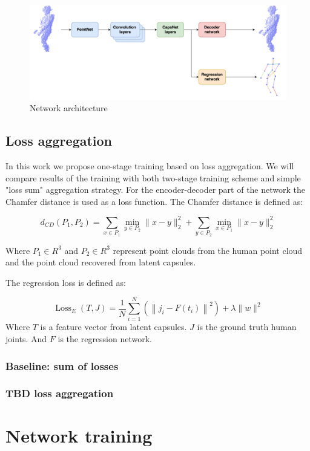 \begin{figure}[htbp]
    \centerline{\includegraphics[scale=.125]{Figures/network architecture.png}}
    \caption{Network architecture}
    \label{img:network-architecture}
\end{figure}


\subsection{Loss aggregation}
In this work we propose one-stage training based on loss aggregation. 
We will compare results of the training with both two-stage training scheme and simple "loss sum" aggregation strategy.
For the encoder-decoder part of the network the Chamfer distance is used as a loss function. 
The Chamfer distance is defined as:

\begin{equation}
d_{C D}\left(P_{1}, P_{2}\right)=\sum_{x \in P_{1}} \min _{y \in P_{2}}\|x-y\|_{2}^{2}+\sum_{y \in P_{2}} \min _{x \in P_{1}}\|x-y\|_{2}^{2}
\label{eqn:chamfer-distance}
\end{equation}

Where $P_1 \in R^3$ and $P_2 \in R^3$ represent point clouds from the human point cloud and the point cloud recovered from latent capsules.


The regression loss is defined as:

\begin{equation}
    \operatorname{Loss}_{E}(T, J)=\frac{1}{N} \sum_{i=1}^{N}\left(\left\|j_{i}-F\left(t_{i}\right)\right\|^{2}\right)+\lambda\|w\|^{2}
\label{eqn:regression-loss}
\end{equation}
Where $T$ is a feature vector from latent capsules. $J$ is the ground truth human joints. And $F$ is the regression network.

\subsubsection{Baseline: sum of losses}

\subsubsection{TBD loss aggregation}




\section{Network training}
\label{network-training}

